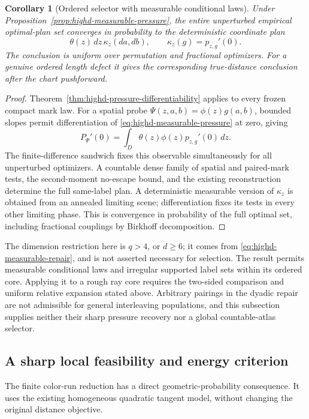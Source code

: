 \documentclass[11pt,reqno]{amsart}
\newtheorem{corollary}[theorem]{Corollary}
\theoremstyle{definition}
\theoremstyle{remark}
\numberwithin{equation}{section}
\begin{document}
\begin{corollary}[Ordered selector with measurable conditional laws]
\label{cor:highd-measurable-selector}
Under Proposition~\ref{prop:highd-measurable-pressure}, the entire
unperturbed empirical optimal-plan set converges in probability to the
deterministic coordinate plan
\[
           \theta(z)\,dz\,\kappa_z(da,db),
             \qquad \kappa_z(g)=p_{z,g}'(0).
\]
The conclusion is uniform over permutation and fractional optimizers.
For a genuine ordered length defect it gives the corresponding
true-distance conclusion after the chart pushforward.
\end{corollary}
\begin{proof}
Theorem~\ref{thm:highd-pressure-differentiability} applies to every
frozen compact mark law. For a spatial probe
\(\Psi(z,a,b)=\phi(z)g(a,b)\), bounded slopes permit differentiation
of \eqref{eq:highd-measurable-pressure} at zero, giving
\[
                P_\Psi'(0)
        =\int_D\theta(z)\phi(z)p_{z,g}'(0)\,dz.
\]
The finite-difference sandwich fixes this observable simultaneously
for all unperturbed optimizers. A countable dense family of spatial
and paired-mark tests, the second-moment no-escape bound, and the
existing reconstruction determine the full same-label plan.
A deterministic measurable version of \(\kappa_z\) is obtained from
an annealed limiting scene; differentiation fixes its tests in every
other limiting phase. This is convergence in probability of the full
optimal set, including fractional couplings by Birkhoff decomposition.
\end{proof}

The dimension restriction here is \(q>4\), or \(d\ge6\); it comes
from \eqref{eq:highd-measurable-repair}, and is not asserted necessary
for selection. The result permits measurable conditional laws and
irregular supported label sets within its ordered core. Applying it
to a rough ray core requires the two-sided comparison and uniform
relative expansion stated above. Arbitrary pairings in the dyadic
repair are not admissible for general interleaving populations, and
this subsection supplies neither their sharp pressure recovery nor
a global countable-atlas selector.

\subsection{A sharp local feasibility and energy criterion}
\label{subsec:forward-poisson-criterion}

The finite color-run reduction has a direct geometric-probability
consequence. It uses the existing homogeneous quadratic tangent model,
without changing the original distance objective.
\end{document}
